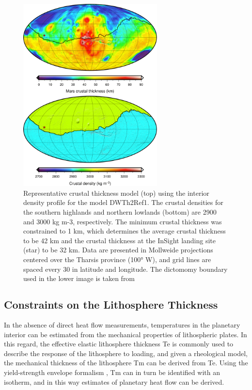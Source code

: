 \begin{figure}[h!]
\begin{center}
\includegraphics[width=0.65\textwidth]
{figures/GravityTopo.png}
\caption{Representative crustal thickness model (top) using the interior density profile for the model DWTh2Ref1. The crustal densities for the southern highlands and northern lowlands (bottom) are 2900 and 3000 kg m-3, respectively. The minimum crustal thickness was constrained to 1 km, which determines the average crustal thickness to be 42 km and the crustal thickness at the InSight landing site (star) to be 32 km. Data are presented in Mollweide projections centered over the Tharsis province (100° W), and grid lines are spaced every 30 in latitude and longitude. The dictomomy boundary used in the lower image is taken from \citep{Andrews-Hanna2008}}
\label{fig:GravityTopo} 
\end{center}
\end{figure}


\subsection{Constraints on the Lithosphere Thickness}

In the absence of direct heat flow measurements, temperatures in the planetary interior can be estimated from the mechanical properties of lithospheric plates. In this regard, the effective elastic lithosphere thickness Te is commonly used to describe the response of the lithosphere to loading, and given a rheological model, the mechanical thickness of the lithosphere Tm can be derived from Te. Using the yield-strength envelope formalism \citep{McNutt1984}, Tm can in turn be identified with an isotherm, and in this way estimates of planetary heat flow can be derived.

